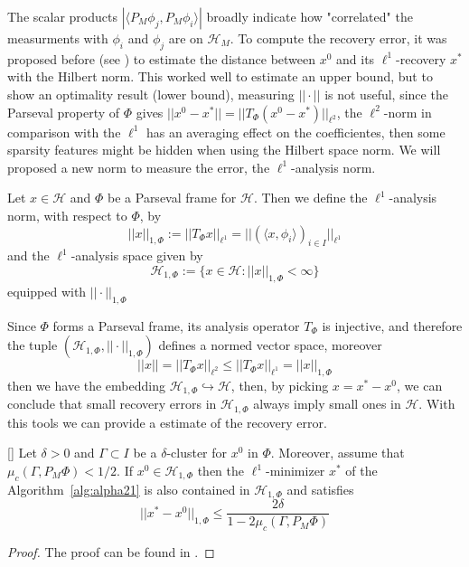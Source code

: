 The scalar products $|\langle P_M\phi_j,P_M\phi_i\rangle|$ broadly indicate how "correlated" the measurments with $\phi_i$ and $\phi_j$ are on $\mathcal{H}_M$. To compute the recovery error, it was proposed before (see \cite{Firstinpaint}) to estimate the distance between $x^0$ and its $\ell^1$-recovery $x^*$ with the Hilbert norm. This worked well to estimate an upper bound, but to show an optimality result (lower bound), measuring $||\cdot||$ is not useful, since the Parseval property of $\Phi$ gives $||x^0-x^*||=||T_{\Phi}(x^0-x^*)||_{\ell^2}$, the $\ell^2$-norm in comparison with the $\ell^1$ has an averaging effect on the coefficientes, then some sparsity features might be hidden when using the Hilbert space norm. We will proposed a new norm to measure the error, the $\ell^1$-analysis norm.

\bigskip

\begin{defn}
Let $x\in\mathcal{H}$ and $\Phi$ be a Parseval frame for $\mathcal{H}$. Then we define the $\ell^1$-analysis norm, with respect to $\Phi$, by
$$
||x||_{1,\Phi}:=||T_{\Phi}x||_{\ell^1}=||(\langle x,\phi_i\rangle)_{i\in I}||_{\ell^1}
$$
and the $\ell^1$-analysis space given by 
$$
\mathcal{H}_{1,\Phi}:=\{x\in \mathcal{H}:||x||_{1,\Phi}<\infty\}
$$
equipped with $||\cdot||_{1,\Phi}$
\end{defn}

Since $\Phi$ forms a Parseval frame, its analysis operator $T_{\Phi}$ is injective, and therefore the tuple $(\mathcal{H}_{1,\Phi},||\cdot||_{1,\Phi})$ defines a normed vector space, moreover
\begin{equation}
\label{eq:alpha24}
||x||=||T_{\Phi}x||_{\ell^2}\leq ||T_{\Phi}x||_{\ell^1}=||x||_{1,\Phi}
\end{equation}
then we have the embedding $\mathcal{H}_{1,\Phi}\hookrightarrow\mathcal{H}$, then, by picking $x=x^*-x^0$, we can conclude that small recovery errors in $\mathcal{H}_{1,\Phi}$ always imply small ones in $\mathcal{H}$. With this tools we can provide a estimate of the recovery error.

\begin{thm}
\label{thm:alpha25}[\cite{Gitta-alpha}]
Let $\delta>0$ and $\Gamma\subset I$ be a $\delta$-cluster for $x^0$ in $\Phi$. Moreover, assume that $\mu_c(\Gamma,P_M\Phi)<1/2$. If $x^0\in\mathcal{H}_{1,\Phi}$ then the $\ell^1$-minimizer $x^*$ of the Algorithm~\ref{alg:alpha21} is also contained in $\mathcal{H}_{1,\Phi}$ and satisfies 
\begin{equation}
\label{eq:alpha25}
||x^*-x^0||_{1,\Phi}\leq \frac{2\delta}{1-2\mu_c(\Gamma,P_M\Phi)}
\end{equation}
\end{thm}
\begin{proof}
The proof can be found in \cite{Firstinpaint}.
\end{proof}

